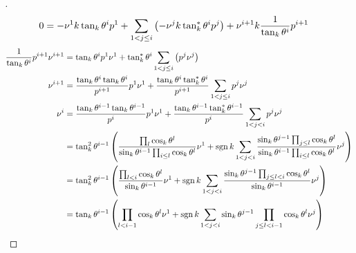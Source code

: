 \documentclass[../main.tex]{subfiles}
\begin{document}
\begin{proof}[]
\begin{align*}
        0
         & =
        -\tensor{\nu}{^1}k\tan_k\tensor{\theta}{^i}\tensor{p}{^1}
        +\sum_{1<j\le i}{\left(-\tensor{\nu}{^j}k\tan_k^\ast\tensor{\theta}{^i}\tensor{p}{^j}\right)}
        +\tensor{\nu}{^{i+1}}k\frac{1}{\tan_k\tensor{\theta}{^i}}\tensor{p}{^{i+1}}
    \end{align*}
    \begin{align*}
        \frac{1}{\tan_k\tensor{\theta}{^i}}\tensor{p}{^{i+1}}\tensor{\nu}{^{i+1}}
         & =
         \tan_k\tensor{\theta}{^i}\tensor{p}{^1}\tensor{\nu}{^1}
        +\tan_k^\ast\tensor{\theta}{^i}\sum_{1<j\le i}{\left(\tensor{p}{^j}\tensor{\nu}{^j}\right)}                                                            \\
        \tensor{\nu}{^{i+1}}
         & =
         \frac{\tan_k\tensor{\theta}{^i}\tan_k\tensor{\theta}{^i}}{\tensor{p}{^{i+1}}}\tensor{p}{^1}\tensor{\nu}{^1}
        +\frac{\tan_k\tensor{\theta}{^i}\tan_k^\ast\tensor{\theta}{^i}}{\tensor{p}{^{i+1}}}\sum_{1<j\le i}{\tensor{p}{^j}\tensor{\nu}{^j}} \\
        \tensor{\nu}{^i}
         & =
         \frac{\tan_k\tensor{\theta}{^{i-1}}\tan_k\tensor{\theta}{^{i-1}}}{\tensor{p}{^{i}}}\tensor{p}{^1}\tensor{\nu}{^1}
        +\frac{\tan_k\tensor{\theta}{^{i-1}}\tan_k^\ast\tensor{\theta}{^{i-1}}}{\tensor{p}{^i}}\sum_{1<j<i}{\tensor{p}{^j}\tensor{\nu}{^j}} \\
        & =
        \tan_k^2\tensor{\theta}{^{i-1}}
        \left(
            \frac{\prod_{l}\cos_k\tensor{\theta}{^l}}{\sin_k\tensor{\theta}{^{i-1}}\prod_{i\le l}\cos_k\tensor{\theta}{^l}}\tensor{\nu}{^1}
            +\sign{k}\sum_{1<j<i}{\frac{\sin_k\tensor{\theta}{^{j-1}}\prod_{j\le l}\cos_k\tensor{\theta}{^l}}{\sin_k\tensor{\theta}{^{i-1}}\prod_{i\le l}\cos_k\tensor{\theta}{^l}}\tensor{\nu}{^j}}
        \right) \\
        & =
        \tan_k^2\tensor{\theta}{^{i-1}}
        \left(
            \frac{\prod_{l<i}\cos_k\tensor{\theta}{^l}}{\sin_k\tensor{\theta}{^{i-1}}}\tensor{\nu}{^1}
            +\sign{k}\sum_{1<j<i}{\frac{\sin_k\tensor{\theta}{^{j-1}}\prod_{j\le l<i}\cos_k\tensor{\theta}{^l}}{\sin_k\tensor{\theta}{^{i-1}}}\tensor{\nu}{^j}}
        \right) \\
        & =
        \tan_k\tensor{\theta}{^{i-1}}
        \left(
            \prod_{l<{i-1}}{\cos_k\tensor{\theta}{^l}}\tensor{\nu}{^1}
            +\sign{k}\sum_{1<j<i}{\sin_k\tensor{\theta}{^{j-1}}\prod_{j\le l<i-1}{\cos_k\tensor{\theta}{^l}}\tensor{\nu}{^j}}
        \right) \\

\end{align*}
\end{proof}
\end{document}
